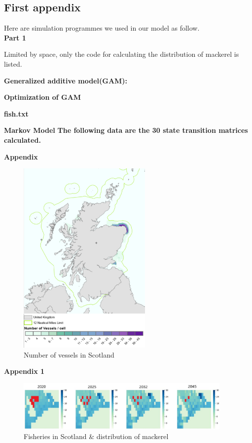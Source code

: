 \documentclass{mcmthesis}
\begin{document}
\begin{appendices}

\section{First appendix}

Here are simulation programmes we used in our model as follow.\\

\textbf{Part 1}

Limited by space, only the code for calculating the distribution of mackerel is listed.

\textbf{\textcolor[rgb]{0.98,0.00,0.00}{Generalized additive model(GAM):}}

\textbf{\textcolor[rgb]{0.98,0.00,0.00}{Optimization of GAM}}

\textbf{\textcolor[rgb]{0.98,0.00,0.00}{fish.txt}}

\textbf{\textcolor[rgb]{0.98,0.00,0.00}{ Markov Model}}
%
\textbf{\textcolor[rgb]{0.98,0.00,0.00}{The following data are the 30 state transition matrices calculated.}}

\textbf{Appendix}
\begin{figure}[h]
\centering
\includegraphics[width=6.5cm]{./figures/map.png}
\caption{ Number of vessels in Scotland}
\end{figure}
\end{appendices}
\textbf{Appendix 1}
\begin{figure}[htbp]
\centering
\includegraphics[width=10.5cm]{./figures/appendix_1.png}
\caption{Fisheries in Scotland \& distribution of mackerel}
\end{figure}\\
\end{document}
